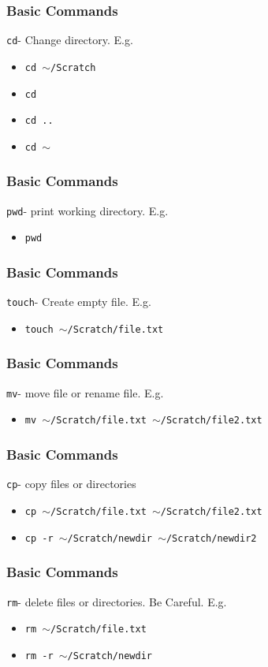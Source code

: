 \documentclass{beamer}
\newcommand{\code}[1]{\colorbox{codegray}{\texttt{#1}}}
\begin{document}
\begin{frame}
\frametitle{Basic Commands}
\code{cd}- Change directory. E.g.
\bigskip
\begin{itemize}
    \item \code{cd $\sim$/Scratch}
    \bigskip
    \item \code{cd}
    \bigskip
    \item \code{cd ..}
    \bigskip
    \item \code{cd $\sim$} 
\end{itemize}
\end{frame}


\begin{frame}
\frametitle{Basic Commands}
\code{pwd}- print working directory. E.g.
\bigskip
\begin{itemize}
    \item \code{pwd}
\end{itemize}
\end{frame}


\begin{frame}
\frametitle{Basic Commands}
\code{touch}- Create empty file. E.g.
\bigskip
\begin{itemize}
    \item \code{touch $\sim$/Scratch/file.txt}
\end{itemize}
\end{frame}


\begin{frame}
\frametitle{Basic Commands}
\code{mv}- move file or rename file. E.g.
\bigskip
\begin{itemize}
    \item \code{mv $\sim$/Scratch/file.txt $\sim$/Scratch/file2.txt}
\end{itemize}
\end{frame}

\begin{frame}
\frametitle{Basic Commands}
\code{cp}- copy files or directories
\bigskip
\begin{itemize}
    \item \code{cp $\sim$/Scratch/file.txt $\sim$/Scratch/file2.txt}
    \bigskip
    \item \code{cp -r $\sim$/Scratch/newdir $\sim$/Scratch/newdir2}
\end{itemize}
\end{frame}


\begin{frame}
\frametitle{Basic Commands}
\code{rm}- delete files or directories. Be Careful. E.g.
\bigskip
\begin{itemize}
    \item \code{rm $\sim$/Scratch/file.txt}
    \bigskip
    \item \code{rm -r $\sim$/Scratch/newdir}
\end{itemize}
\end{frame}
\end{document}
